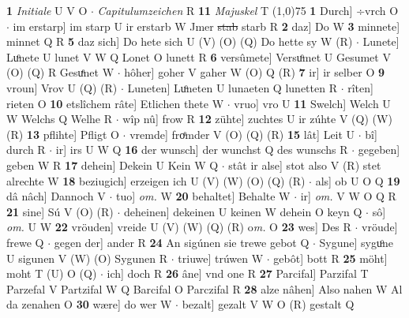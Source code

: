 \documentclass[8pt,a4paper,notitlepage]{article}
\begin{document}
\begin{table}[ht]
\begin{minipage}[t]{0.5\linewidth}
\textbf{1} \textit{Initiale} U V O   $\cdot$ \textit{Capitulumzeichen} R  \textbf{11} \textit{Majuskel} T  \newline
\line(1,0){75} \newline
\textbf{1} Durch] ÷vrch O  $\cdot$ im erstarp] im starp U ir erstarb W Jmer \sout{stab} starb R \textbf{2} daz] Do W \textbf{3} minnete] minnet Q R \textbf{5} daz sich] Do hete sich U (V) (O) (Q) Do hette sy W (R)  $\cdot$ Lunete] Luͦnete U lunet V W Q Lonet O lunett R \textbf{6} versûmete] Versuͦmet U Gesumet V (O) (Q) R Gesuͤnet W  $\cdot$ hôher] goher V gaher W (O) Q (R) \textbf{7} ir] ir selber O \textbf{9} vroun] Vrov U (Q) (R)  $\cdot$ Luneten] Luͦneten U lunaeten Q lunetten R  $\cdot$ rîten] rieten O \textbf{10} etslîchem râte] Etlichen thete W  $\cdot$ vruo] vro U \textbf{11} Swelch] Welch U W Welchs Q Welhe R  $\cdot$ wîp nû] frow R \textbf{12} zühte] zuchtes U ir zúhte V (Q) (W) (R) \textbf{13} pflihte] Pfligt O  $\cdot$ vremde] froͤmder V (O) (Q) (R) \textbf{15} lât] Leit U  $\cdot$ bî] durch R  $\cdot$ ir] irs U W Q \textbf{16} der wunsch] der wunchst Q des wunschs R  $\cdot$ gegeben] geben W R \textbf{17} dehein] Dekein U Kein W Q  $\cdot$ stât ir alse] stot also V (R) stet alrechte W \textbf{18} beziugich] erzeigen ich U (V) (W) (O) (Q) (R)  $\cdot$ als] ob U O Q \textbf{19} dâ nâch] Dannoch V  $\cdot$ tuo] \textit{om.} W \textbf{20} behaltet] Behalte W  $\cdot$ ir] \textit{om.} V W O Q R \textbf{21} sine] Sú V (O) (R)  $\cdot$ deheinen] dekeinen U keinen W dehein O keyn Q  $\cdot$ sô] \textit{om.} U W \textbf{22} vröuden] vreide U (V) (W) (Q) (R) o\textit{m. } O \textbf{23} wes] Des R  $\cdot$ vröude] frewe Q  $\cdot$ gegen der] ander R \textbf{24} An sigúnen sie trewe gebot Q  $\cdot$ Sygune] syguͦne U sigunen V (W) (O) Sygunen R  $\cdot$ triuwe] trúwen W  $\cdot$ gebôt] bott R \textbf{25} möht] moht T (U) O (Q)  $\cdot$ ich] doch R \textbf{26} âne] vnd one R \textbf{27} Parcifal] Parzifal T Parzefal V Partzifal W Q Barcifal O Parczifal R \textbf{28} alze nâhen] Also nahen W Al da zenahen O \textbf{30} wære] do wer W  $\cdot$ bezalt] gezalt V W O (R) gestalt Q \newline
\end{minipage}
\end{table}
\end{document}
